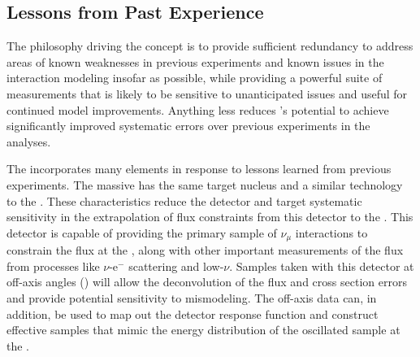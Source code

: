 \subsection{Lessons from Past Experience}
\label{sec:appx-nd:overview-experience}

The philosophy driving the    concept is to provide sufficient redundancy to address areas of known weaknesses in previous experiments and known issues in the interaction modeling insofar as possible, while providing a powerful suite of measurements that is likely to be sensitive to unanticipated issues and useful for continued model improvements.  Anything less reduces 's potential to achieve significantly improved systematic errors over previous experiments in the  analyses. 


The    incorporates many elements in response to lessons learned from previous experiments. 
The massive    has the same target nucleus and a similar technology to the  . These characteristics reduce the detector and target systematic sensitivity in the  extrapolation of flux constraints from this detector to the  .  This detector is capable of providing the primary  sample of  $\nu_{\mu}$ interactions to constrain the flux at the  , along with other important measurements of the flux from processes like $\nu$-e$^{-}$ scattering and low-$\nu$.  Samples taken with this detector at off-axis angles () will allow the deconvolution of the flux and cross section errors and provide potential sensitivity to mismodeling.  The off-axis data can, in addition, be used to map out the detector response function and construct effective   samples that mimic the energy distribution of the oscillated sample at the  . 

